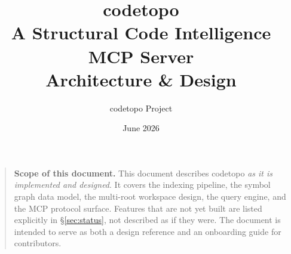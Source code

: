 \documentclass{MastersThesis}
\title{codetopo\\[0.4em]\Large A Structural Code Intelligence MCP Server\\[0.3em]\normalsize Architecture \& Design}
\author{codetopo Project}
\date{June 2026}
\begin{document}
\maketitle

\begin{quote}\small
\textbf{Scope of this document.} This document describes codetopo \emph{as it
is implemented and designed}. It covers the indexing pipeline, the symbol graph
data model, the multi-root workspace design, the query engine, and the MCP
protocol surface. Features that are not yet built are listed explicitly in
\S\ref{sec:status}, not described as if they were. The document is intended to
serve as both a design reference and an onboarding guide for contributors.
\end{quote}

\tableofcontents
\newpage













\end{document}
